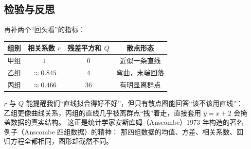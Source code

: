 \subsection{检验与反思}
再补两个“回头看”的指标：
\begin{center}
\footnotesize
\setlength{\tabcolsep}{6pt}
\renewcommand{\arraystretch}{1.4}
\begin{tabular}{c|ccc}
\toprule
组别 & 相关系数 $r$ & 残差平方和 $Q$ & 散点形态 \\
\midrule
甲组 & $1$ & $0$ & 近似一条直线 \\
乙组 & $\approx0.845$ & $4$ & 弯曲，末端回落 \\
丙组 & $\approx0.466$ & $36$ & 有明显离群点 \\
\bottomrule
\end{tabular}
\end{center}
$r$ 与 $Q$ 能提醒我们“直线拟合得好不好”，但只有散点图能回答“该不该用直线”：
乙组更像曲线关系，丙组的直线几乎被离群点“拽”着走，直接套用 $\hat y=x+2$ 会掩盖数据的真实结构。
这正是统计学家安斯库姆（Anscombe）1973 年构造的著名例子（Anscombe 四组数据）的精神：
那四组数据的均值、方差、相关系数、回归方程全都相同，图形却截然不同。
